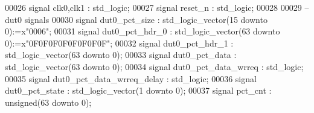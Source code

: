 \begin{DoxyCode}
00026 \textcolor{keywordflow}{signal} \textcolor{vhdlchar}{clk0}\textcolor{vhdlchar}{,}\textcolor{vhdlchar}{clk1}        \textcolor{vhdlchar}{:} \textcolor{comment}{std\_logic};
00027 \textcolor{keywordflow}{signal} \textcolor{vhdlchar}{reset_n}       \textcolor{vhdlchar}{:} \textcolor{comment}{std\_logic}; 
00028    
00029 \textcolor{keyword}{   --dut0 signals}
00030 \textcolor{keywordflow}{signal} \textcolor{vhdlchar}{dut0_pct_size}          \textcolor{vhdlchar}{:} \textcolor{comment}{std\_logic\_vector}\textcolor{vhdlchar}{(}\textcolor{vhdllogic}{}\textcolor{vhdllogic}{15} \textcolor{keywordflow}{downto} \textcolor{vhdllogic}{}\textcolor{vhdllogic}{0}\textcolor{vhdlchar}{)}\textcolor{vhdlchar}{:=}\textcolor{vhdlchar}{x}\textcolor{vhdllogic}{"0006"};
00031 \textcolor{keywordflow}{signal} \textcolor{vhdlchar}{dut0_pct_hdr_0}         \textcolor{vhdlchar}{:} \textcolor{comment}{std\_logic\_vector}\textcolor{vhdlchar}{(}\textcolor{vhdllogic}{}\textcolor{vhdllogic}{63} \textcolor{keywordflow}{downto} \textcolor{vhdllogic}{}\textcolor{vhdllogic}{0}\textcolor{vhdlchar}{)}\textcolor{vhdlchar}{:=}\textcolor{vhdlchar}{x}\textcolor{vhdllogic}{"0F0F0F0F0F0F0F0F"};
00032 \textcolor{keywordflow}{signal} \textcolor{vhdlchar}{dut0_pct_hdr_1}         \textcolor{vhdlchar}{:} \textcolor{comment}{std\_logic\_vector}\textcolor{vhdlchar}{(}\textcolor{vhdllogic}{}\textcolor{vhdllogic}{63} \textcolor{keywordflow}{downto} \textcolor{vhdllogic}{}\textcolor{vhdllogic}{0}\textcolor{vhdlchar}{)};
00033 \textcolor{keywordflow}{signal} \textcolor{vhdlchar}{dut0_pct_data}          \textcolor{vhdlchar}{:} \textcolor{comment}{std\_logic\_vector}\textcolor{vhdlchar}{(}\textcolor{vhdllogic}{}\textcolor{vhdllogic}{63} \textcolor{keywordflow}{downto} \textcolor{vhdllogic}{}\textcolor{vhdllogic}{0}\textcolor{vhdlchar}{)};
00034 \textcolor{keywordflow}{signal} \textcolor{vhdlchar}{dut0_pct_data_wrreq}    \textcolor{vhdlchar}{:} \textcolor{comment}{std\_logic};
00035 \textcolor{keywordflow}{signal} \textcolor{vhdlchar}{dut0_pct_data_wrreq_delay} \textcolor{vhdlchar}{:} \textcolor{comment}{std\_logic};
00036 \textcolor{keywordflow}{signal} \textcolor{vhdlchar}{dut0_pct_state}         \textcolor{vhdlchar}{:} \textcolor{comment}{std\_logic\_vector}\textcolor{vhdlchar}{(}\textcolor{vhdllogic}{}\textcolor{vhdllogic}{1} \textcolor{keywordflow}{downto} \textcolor{vhdllogic}{}\textcolor{vhdllogic}{0}\textcolor{vhdlchar}{)};
00037 \textcolor{keywordflow}{signal} \textcolor{vhdlchar}{pct_cnt}                \textcolor{vhdlchar}{:} \textcolor{comment}{unsigned}\textcolor{vhdlchar}{(}\textcolor{vhdllogic}{}\textcolor{vhdllogic}{63} \textcolor{keywordflow}{downto} \textcolor{vhdllogic}{}\textcolor{vhdllogic}{0}\textcolor{vhdlchar}{)};

\end{DoxyCode}
